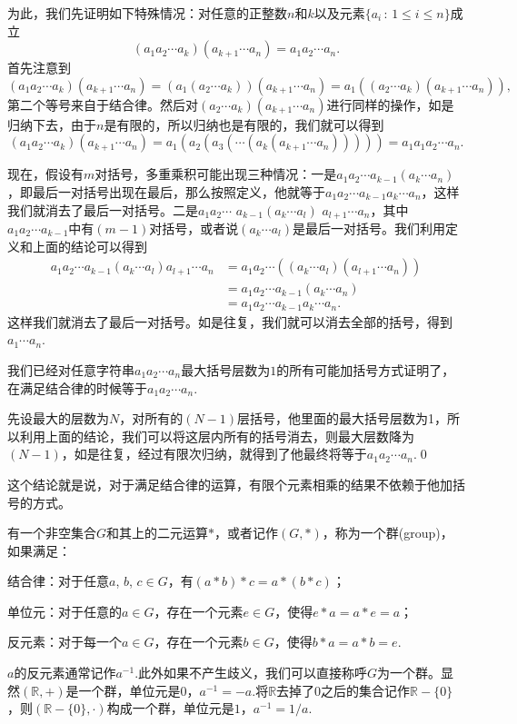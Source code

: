 为此，我们先证明如下特殊情况：对任意的正整数$n$和$k$以及元素$\{a_i\,:\, 1\leq i \leq n\}$成立
\[(a_1a_2\cdots a_{k})(a_{k+1}\cdots a_{n})=a_1a_2\cdots a_n.\]
首先注意到
\[
(a_1a_2\cdots a_{k})(a_{k+1}\cdots a_{n})=(a_1(a_2\cdots a_{k}))(a_{k+1}\cdots a_{n})=a_1((a_2\cdots a_{k})(a_{k+1}\cdots a_{n})),
\]
第二个等号来自于结合律。然后对$(a_2\cdots a_{k})(a_{k+1}\cdots a_{n})$进行同样的操作，如是归纳下去，由于$n$是有限的，所以归纳也是有限的，我们就可以得到
\[
(a_1a_2\cdots a_{k})(a_{k+1}\cdots a_{n})=a_1(a_2(a_3(\cdots (a_{k}(a_{k+1}\cdots a_{n})))))=a_1a_1a_2\cdots a_n.
\]

现在，假设有$m$对括号，多重乘积可能出现三种情况：一是$a_1a_2\cdots a_{k-1}(a_{k}\cdots a_n)$，即最后一对括号出现在最后，那么按照定义，他就等于$a_1a_2\cdots a_{k-1}a_{k}\cdots a_n$，这样我们就消去了最后一对括号。二是$a_1a_2\cdots$ $a_{k-1}(a_{k}\cdots a_l)$ $a_{l+1}\cdots a_n$，其中$a_1a_2\cdots a_{k-1}$中有$(m-1)$对括号，或者说$(a_{k}\cdots a_l)$是最后一对括号。我们利用定义和上面的结论可以得到
\begin{align*}
	a_1a_2\cdots a_{k-1}(a_{k}\cdots a_l)a_{l+1}\cdots a_n&=a_1a_2\cdots ((a_{k}\cdots a_l)(a_{l+1}\cdots a_n))\\
	&=a_1a_2\cdots a_{k-1}(a_{k}\cdots a_n)\\
	&=a_1a_2\cdots a_{k-1}a_{k}\cdots a_n.
\end{align*}
这样我们就消去了最后一对括号。如是往复，我们就可以消去全部的括号，得到$a_1\cdots a_n$.

我们已经对任意字符串$a_1a_2\cdots a_n$最大括号层数为$1$的所有可能加括号方式证明了，在满足结合律的时候等于$a_1a_2\cdots a_n$.

先设最大的层数为$N$，对所有的$(N-1)$层括号，他里面的最大括号层数为1，所以利用上面的结论，我们可以将这层内所有的括号消去，则最大层数降为$(N-1)$，如是往复，经过有限次归纳，就得到了他最终将等于$a_1a_2\cdots a_n$.\qed 

这个结论就是说，对于满足结合律的运算，有限个元素相乘的结果不依赖于他加括号的方式。

\para 有一个非空集合$G$和其上的二元运算$*$，或者记作$(G,*)$，称为一个群(group)，如果满足：

结合律：对于任意$a$, $b$, $c\in G$，有$(a*b)*c=a*(b*c)$；

单位元：对于任意的$a\in G$，存在一个元素$e\in G$，使得$e*a=a*e=a$；

反元素：对于每一个$a\in G$，存在一个元素$b\in G$，使得$b*a=a*b=e$.

$a$的反元素通常记作$a^{-1}$.此外如果不产生歧义，我们可以直接称呼$G$为一个群。显然$(\mathbb{R},+)$是一个群，单位元是0，$a^{-1}=-a$.将$\mathbb{R}$去掉了$0$之后的集合记作$\mathbb{R}-\{0\}$，则$(\mathbb{R}-\{0\},\cdot)$构成一个群，单位元是$1$，$a^{-1}=1/a$.

